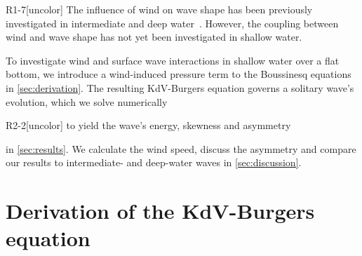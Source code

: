 \documentclass{jfm}
\begin{document}
\begin{LineLabel}{R1-7}[uncolor]
The influence of wind on wave shape has been previously investigated in
intermediate and deep water~\citep{zdyrski2020wind}.
However, the coupling between wind and wave shape has not yet been
investigated in shallow water.
\end{LineLabel}
To investigate wind and surface wave interactions in shallow water over
a flat bottom, we introduce a wind-induced pressure term to the
Boussinesq equations in \cref{sec:derivation}.
The resulting KdV-Burgers equation governs a solitary wave's evolution,
which we solve numerically
\begin{LineLabel}{R2-2}[uncolor]
to yield the wave's energy, skewness and asymmetry
\end{LineLabel}
in \cref{sec:results}.
We calculate the wind speed, discuss the asymmetry and
compare our results to intermediate- and deep-water waves in
\cref{sec:discussion}.

\section{\label{sec:derivation} Derivation of the KdV-Burgers equation}
\end{document}
